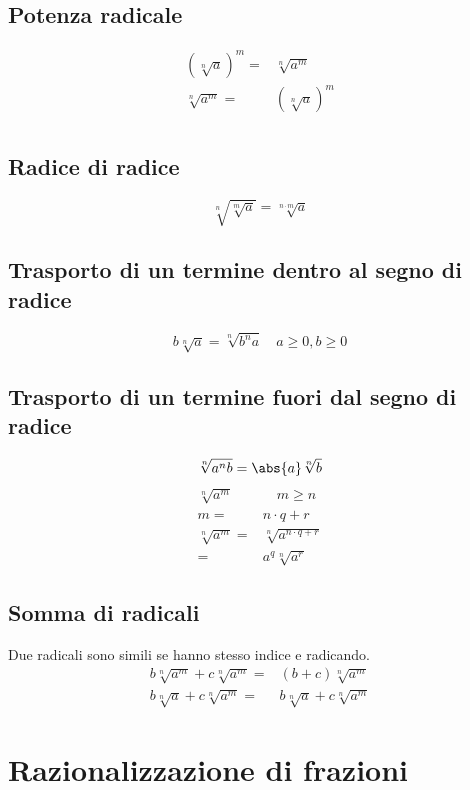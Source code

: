 \section{Potenza radicale}
\begin{align*}
\left(\sqrt[n]{a}\right)^m=&\sqrt[n]{a^m}\\
\sqrt[n]{a^m}=&\left(\sqrt[n]{a}\right)^m\\
\end{align*}
\section{Radice di radice}
\begin{equation*}
\sqrt[n]{\sqrt[m]{a}}=\sqrt[n\cdot m]{a}
\end{equation*}
\section{Trasporto di un termine dentro al segno di radice}
\begin{equation*}
b\sqrt[n]{a}=\sqrt[n]{b^na}\quad a\geq 0,b\geq 0 
\end{equation*}
\section{Trasporto di un termine fuori dal segno di radice}
\begin{equation*}
\sqrt[n]{a^nb}=\abs{a}\sqrt[n]{b}
\end{equation*}
\begin{align*}
\sqrt[n]{a^m}&\quad m\geq n\\
m=&n\cdot q+r\\
\sqrt[n]{a^m}=&\sqrt[n]{a^{n\cdot q+r}}\\
=&a^q\sqrt[n]{a^r}
\end{align*}
\section{Somma di radicali}
Due radicali sono simili se hanno stesso indice e radicando.
\begin{align*}
b\sqrt[n]{a^m}+c\sqrt[n]{a^m}=&(b+c)\sqrt[n]{a^m}\\
b\sqrt[n]{a}+c\sqrt[n]{a^m}=&b\sqrt[n]{a}+c\sqrt[n]{a^m}
\end{align*}
\chapter{Razionalizzazione di frazioni}
